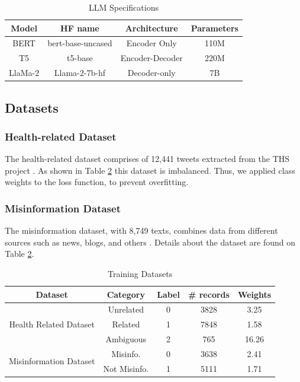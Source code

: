   \begin{table}[!htb]
\centering
\caption{LLM Specifications}
{
\begin{tabular}{||c | c | c | c||} 
 \hline
\textbf{Model} & \textbf{HF name} & \textbf{Architecture} & \textbf{Parameters} \\
 \hline
 BERT & bert-base-uncased & Encoder Only & 110M \\ 
 \hline
 T5 & t5-base & Encoder-Decoder & 220M \\
 \hline
 LlaMa-2 & Llama-2-7b-hf & Decoder-only & 7B \\
 \hline
\end{tabular}
}
\label{table:LLM}
\end{table}

\subsection{Datasets}

\subsubsection{Health-related Dataset}
The health-related dataset comprises of 12,441 tweets extracted from the THS project \cite{8622504}. As shown in Table \ref{table:dataset} this dataset is imbalanced. Thus, we applied class weights to the loss function, to prevent overfitting.

\subsubsection{Misinformation Dataset}
The misinformation dataset, with 8,749 texts, combines data from different sources such as news, blogs, and others \cite{stephencrone2022,coviddata,covidunesco}. 
Details about the dataset are found on Table \ref{table:dataset}.

\begin{table}[!htb]
	\centering
	\caption{Training Datasets}
	{
	\begin{tabular}{||c | c | c | c | c||} 
		\hline
		\textbf{Dataset} &
		\textbf{Category} & \textbf{Label} & \textbf{\# records} & \textbf{Weights} \\
		\hline
		\multirow{3}{6.1em}{Health Related Dataset} & Unrelated & 0 & 3828 & 3.25  \\
		& Related & 1 & 7848 & 1.58  \\ 
		& Ambiguous & 2 & 765 & 16.26 \\
		\hline
		\multirow{2}{6.1em}{Misinformation Dataset} & Misinfo. & 0 & 3638 & 2.41\\ 
		& Not Misinfo. & 1 & 5111 & 1.71 \\
		\hline
	\end{tabular}
	}
	\label{table:dataset}
\end{table}

